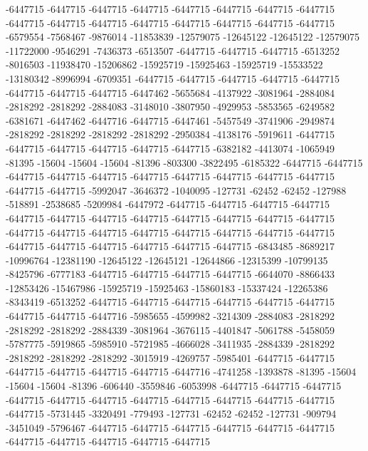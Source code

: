 -6447715 -6447715 -6447715 -6447715 -6447715 -6447715 -6447715 -6447715 -6447715 -6447715 -6447715 -6447715 -6447715 -6447715 -6447715 -6447715 -6579554 -7568467 -9876014 -11853839 -12579075 -12645122 -12645122 -12579075 -11722000 -9546291 -7436373 -6513507 -6447715 -6447715 -6447715 -6513252 -8016503 -11938470 -15206862 -15925719 -15925463 -15925719 -15533522 -13180342 -8996994 -6709351 -6447715 -6447715 -6447715 -6447715 -6447715 -6447715 -6447715 -6447715 -6447462 -5655684 -4137922 -3081964 -2884084 -2818292 -2818292 -2884083 -3148010 -3807950 -4929953 -5853565 -6249582 -6381671 -6447462 -6447716 -6447715 -6447461 -5457549 -3741906 -2949874 -2818292 -2818292 -2818292 -2818292 -2950384 -4138176 -5919611 -6447715 -6447715 -6447715 -6447715 -6447715 -6447715 -6382182 -4413074 -1065949 -81395 -15604 -15604 -15604 -81396 -803300 -3822495 -6185322 -6447715 -6447715 -6447715 -6447715 -6447715 -6447715 -6447715 -6447715 -6447715 -6447715 -6447715 -6447715 -5992047 -3646372 -1040095 -127731 -62452 -62452 -127988 -518891 -2538685 -5209984 -6447972 -6447715 -6447715 -6447715 -6447715 -6447715 -6447715 -6447715 -6447715 -6447715 -6447715
-6447715 -6447715 -6447715 -6447715 -6447715 -6447715 -6447715 -6447715 -6447715 -6447715 -6447715 -6447715 -6447715 -6447715 -6447715 -6447715 -6843485 -8689217 -10996764 -12381190 -12645122 -12645121 -12644866 -12315399 -10799135 -8425796 -6777183 -6447715 -6447715 -6447715 -6447715 -6644070 -8866433 -12853426 -15467986 -15925719 -15925463 -15860183 -15337424 -12265386 -8343419 -6513252 -6447715 -6447715 -6447715 -6447715 -6447715 -6447715 -6447715 -6447715 -6447716 -5985655 -4599982 -3214309 -2884083 -2818292 -2818292 -2818292 -2884339 -3081964 -3676115 -4401847 -5061788 -5458059 -5787775 -5919865 -5985910 -5721985 -4666028 -3411935 -2884339 -2818292 -2818292 -2818292 -2818292 -3015919 -4269757 -5985401 -6447715 -6447715 -6447715 -6447715 -6447715 -6447715 -6447716 -4741258 -1393878 -81395 -15604 -15604 -15604 -81396 -606440 -3559846 -6053998 -6447715 -6447715 -6447715 -6447715 -6447715 -6447715 -6447715 -6447715 -6447715 -6447715 -6447715 -6447715 -5731445 -3320491 -779493 -127731 -62452 -62452 -127731 -909794 -3451049 -5796467 -6447715 -6447715 -6447715 -6447715 -6447715 -6447715 -6447715 -6447715 -6447715 -6447715 -6447715
